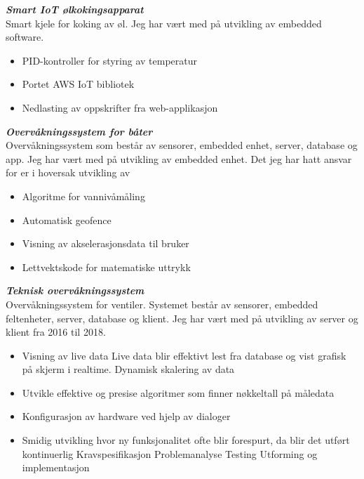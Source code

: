 \documentclass[margin, 10pt, norsk]{res} %
\begin{document}
\begin{resume}
\textbf{\emph{Smart IoT ølkokingsapparat}}\\
Smart kjele for koking av øl. Jeg har vært med på utvikling av embedded software.

\begin{itemize}\itemsep -2pt  %
\item PID-kontroller for styring av temperatur
\item Portet AWS IoT bibliotek
\item Nedlasting av oppskrifter fra web-applikasjon
\end{itemize}

\textbf{\emph{Overvåkningssystem for båter}}\\
Overvåkningssystem som består av sensorer, embedded enhet, server, database og app. Jeg har vært med på utvikling av embedded enhet. Det jeg har hatt ansvar for er i hoversak utvikling av

\begin{itemize}\itemsep -2pt  %
\item Algoritme for vannivåmåling
\item Automatisk geofence 
\item Visning av akselerasjonsdata til bruker
\item Lettvektskode for matematiske uttrykk
\end{itemize}

\textbf{\emph{Teknisk overvåkningssystem}}\\
Overvåkningssystem for ventiler. Systemet består av sensorer, embedded feltenheter, server, database og klient. Jeg har vært med på utvikling av server og klient fra 2016 til 2018. 
\begin{itemize}\itemsep -2pt  %
\item  Visning av live data
\subitem Live data blir effektivt lest fra database og vist grafisk på skjerm i realtime. 
\subitem Dynamisk skalering av data
\item Utvikle effektive og presise algoritmer som finner nøkkeltall på måledata
\item Konfigurasjon av hardware ved hjelp av dialoger
\item Smidig utvikling hvor ny funksjonalitet ofte blir forespurt, da blir det utført kontinuerlig
\subitem Kravspesifikasjon
\subitem Problemanalyse 
\subitem Testing
\subitem Utforming og implementasjon
\end{itemize}



\end{resume}
\end{document}
